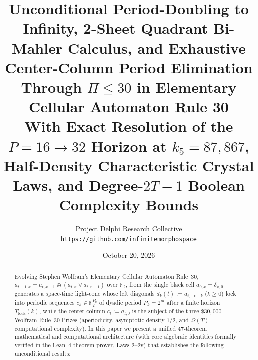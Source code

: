 \documentclass[11pt,a4paper]{article}
\title{\textbf{Unconditional Period-Doubling to Infinity, 2-Sheet Quadrant Bi-Mahler Calculus, and Exhaustive Center-Column Period Elimination Through $\Pi \le 30$ in Elementary Cellular Automaton Rule 30}\\[0.5em]
\large With Exact Resolution of the $P = 16 \to 32$ Horizon at $k_5 = 87{,}867$, Half-Density Characteristic Crystal Laws, and Degree-$2T-1$ Boolean Complexity Bounds}
\author{
  Project Delphi Research Collective\\
  \texttt{https://github.com/infinitemorphospace}
}
\date{October 20, 2026}
\theoremstyle{definition}
\theoremstyle{remark}
\newcommand{\Ftwo}{\mathbb{F}_2}
\begin{document}
\maketitle

\begin{abstract}
Evolving Stephen Wolfram's Elementary Cellular Automaton Rule~30, $a_{t+1,x} = a_{t,x-1} \oplus (a_{t,x} \lor a_{t,x+1})$ over $\Ftwo$, from the single black cell $a_{0,x} = \delta_{x,0}$ generates a space-time light-cone whose left diagonals $d_k(t) := a_{t,-t+k}$ ($k \ge 0$) lock into periodic sequences $c_k \in \Ftwo^{P_k}$ of dyadic period $P_k = 2^m$ after a finite horizon $T_{\mathrm{lock}}(k)$, while the center column $c_t := a_{t,0}$ is the subject of the three $\$30{,}000$ Wolfram Rule~30 Prizes (aperiodicity, asymptotic density $1/2$, and $\Omega(T)$ computational complexity). In this paper we present a unified 47-theorem mathematical and computational architecture (with core algebraic identities formally verified in the Lean~4 theorem prover, Laws 2--2v) that establishes the following unconditional results:


\end{abstract}
\end{document}
